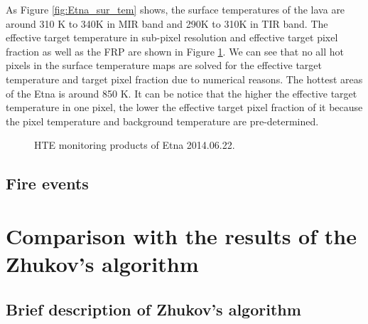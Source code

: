 \noindent As Figure \ref{fig:Etna_sur_tem} shows, the surface temperatures of the lava are around 310 K to 340K in MIR band and 290K to 310K in TIR band. The effective target temperature in sub-pixel resolution and effective target pixel fraction as well as the FRP are shown in Figure \ref{fig:Etna_HTE}. We can see that no all hot pixels in the surface temperature maps are solved for the effective target temperature and target pixel fraction due to numerical reasons. The hottest areas of the Etna is around 850 K. It can be notice that the higher the effective target temperature in one pixel, the lower the effective target pixel fraction of it because the pixel temperature and background temperature are pre-determined.\\

\begin{figure}[!htbp]
\centering
{}
\hspace{0.1in}
\caption{HTE monitoring products of Etna 2014.06.22.}
\label{fig:Etna_HTE}
\end{figure}




\subsection{Fire events}


\section{Comparison with the results of the Zhukov's algorithm}


\subsection{Brief description of Zhukov's algorithm}

